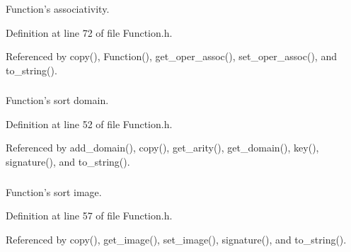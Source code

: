 Function's associativity. 



Definition at line 72 of file Function.h.

Referenced by copy(), Function(), get\_\-oper\_\-assoc(), set\_\-oper\_\-assoc(), and to\_\-string().\hypertarget{classgenevalmag_1_1Function_e8e057eeebfabdc524e10e42e54da43c}{
\subsubsection[{f\_\-domain}]{}}
\label{classgenevalmag_1_1Function_e8e057eeebfabdc524e10e42e54da43c}


Function's sort domain. 



Definition at line 52 of file Function.h.

Referenced by add\_\-domain(), copy(), get\_\-arity(), get\_\-domain(), key(), signature(), and to\_\-string().\hypertarget{classgenevalmag_1_1Function_4abfbb9239231cf2a586935546a585f8}{
\subsubsection[{f\_\-image}]{}}
\label{classgenevalmag_1_1Function_4abfbb9239231cf2a586935546a585f8}


Function's sort image. 



Definition at line 57 of file Function.h.

Referenced by copy(), get\_\-image(), set\_\-image(), signature(), and to\_\-string().\hypertarget{classgenevalmag_1_1Function_681af241838253c6b001e92541be7b4c}{
\subsubsection[{f\_\-is\_\-operator}]{}}
\label{classgenevalmag_1_1Function_681af241838253c6b001e92541be7b4c}


